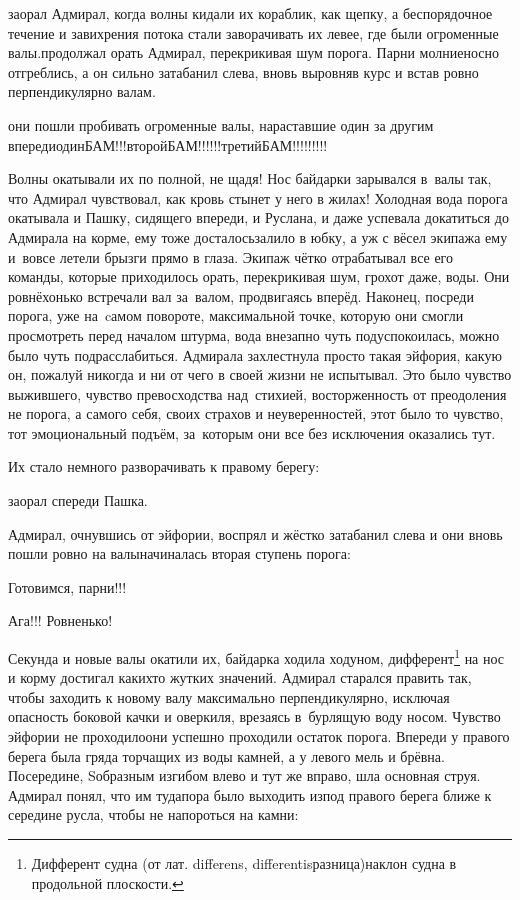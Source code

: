 \mdash заорал Адмирал, когда волны кидали их кораблик, как щепку, а беспорядочное течение и завихрения потока стали заворачивать их левее, где были огроменные валы.\mdash продолжал орать Адмирал, перекрикивая шум порога. Парни молниеносно отгреблись, а он сильно затабанил слева, вновь выровняв курс и встав ровно перпендикулярно валам. 

\mdash они пошли пробивать огроменные валы, нараставшие один за другим впереди\mdash один\mdash БАМ!!!\mdash второй\mdash БАМ!!!!!!\mdash третий\mdash БАМ!!!!!!!!!

Волны окатывали их по полной, не щадя! Нос байдарки зарывался в~валы так, что Адмирал чувствовал, как кровь стынет у него в жилах! Холодная вода порога окатывала и Пашку, сидящего впереди, и Руслана, и даже успевала докатиться до Адмирала на корме, ему тоже досталось\mdash залило в юбку, а уж с вёсел экипажа ему и~вовсе летели брызги прямо в глаза. Экипаж чётко отрабатывал все его команды, которые приходилось орать, перекрикивая шум, грохот даже, воды. Они ровнёхонько встречали вал за~валом, продвигаясь вперёд. Наконец, посреди порога, уже на~cамом повороте, максимальной точке, которую они смогли просмотреть перед началом штурма, вода внезапно чуть подуспокоилась, можно было чуть подрасслабиться. Адмирала захлестнула просто такая эйфория, какую он, пожалуй никогда и ни от чего в своей жизни не испытывал. Это было чувство выжившего, чувство превосходства над~стихией, восторженность от преодоления не порога, а самого себя, своих страхов и неуверенностей, этот было то чувство, тот эмоциональный подъём, за~которым они все без исключения оказались тут. 

Их стало немного разворачивать к правому берегу:

\mdash заорал спереди Пашка.

Адмирал, очнувшись от эйфории, воспрял и жёстко затабанил слева и они вновь пошли ровно на валы\mdash начиналась вторая ступень порога:

\diagdash Готовимся, парни!!!

\diagdash Ага!!! Ровненько!

\renewcommand*{\thefootnote}{\fnsymbol{footnote}}
\setcounter{footnote}{0}
Секунда и новые валы окатили их, байдарка ходила ходуном, дифферент\footnote{Дифферент судна (от лат. differens, differentis\mdash разница)\mdash наклон судна в продольной плоскости\cite{МорскойСправочник}.} на нос и корму достигал каких\sdash то жутких значений. Адмирал старался править так, чтобы заходить к новому валу максимально перпендикулярно, исключая опасность боковой качки и оверкиля, врезаясь в~бурлящую воду носом. Чувство эйфории не проходило\mdash они успешно проходили остаток порога. Впереди у правого берега была гряда торчащих из воды камней, а у левого мель и брёвна. Посередине, S\sdash образным изгибом влево и тут же вправо, шла основная струя. Адмирал понял, что им туда\mdash пора было выходить из\sdash под правого берега ближе к середине русла, чтобы не напороться на камни:

